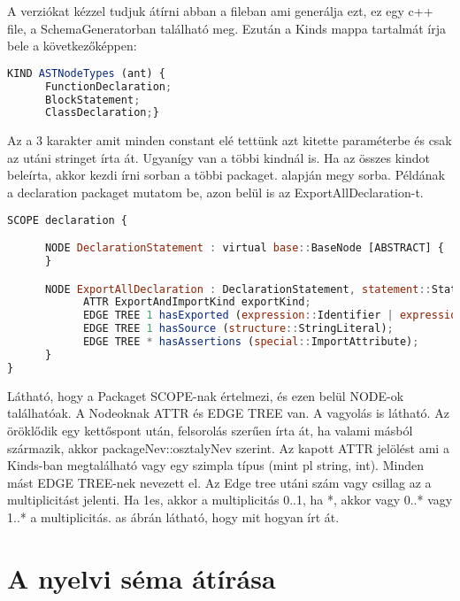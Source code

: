 A verziókat kézzel tudjuk átírni abban a fileban ami generálja ezt, ez egy c++ file, a SchemaGeneratorban található meg.
Ezután a Kinds mappa tartalmát írja bele a következőképpen:
\begin{lstlisting}[caption={Asg file kind},label={lst:asg_file_kinds}, language={JavaScript}]
KIND ASTNodeTypes (ant) {
      FunctionDeclaration;
      BlockStatement;
      ClassDeclaration;}
\end{lstlisting}
Az a 3 karakter amit minden constant elé tettünk azt kitette paraméterbe és csak az utáni stringet írta át. Ugyanígy van a többi kindnál is.
Ha az összes kindot beleírta, akkor kezdi írni sorban a többi packaget.  alapján megy sorba.
Példának a declaration packaget mutatom be, azon belül is az ExportAllDeclaration-t.
\begin{lstlisting}[caption={Asg file ExportAllDeclaration},label={lst:asg_file_export_all_declaration}, language={JavaScript}]
SCOPE declaration {

      NODE DeclarationStatement : virtual base::BaseNode [ABSTRACT] {
      }

      NODE ExportAllDeclaration : DeclarationStatement, statement::Statement, virtual statement::ProgramStatement, special::Node {
            ATTR ExportAndImportKind exportKind;
            EDGE TREE 1 hasExported (expression::Identifier | expression::LiteralExpression);
            EDGE TREE 1 hasSource (structure::StringLiteral);
            EDGE TREE * hasAssertions (special::ImportAttribute);
      }
}
\end{lstlisting}
Látható, hogy a Packaget SCOPE-nak értelmezi, és ezen belül NODE-ok találhatóak.
A Nodeoknak ATTR és EDGE TREE van. A vagyolás is látható.
Az öröklődik egy kettőspont után, felsorolás szerűen írta át, ha valami másból származik, akkor packageNev::osztalyNev szerint.
Az kapott ATTR jelölést ami a Kinds-ban megtalálható vagy egy szimpla típus (mint pl string, int).
Minden mást EDGE TREE-nek nevezett el. Az Edge tree utáni szám vagy csillag az a multiplicitást jelenti.
Ha 1es, akkor a multiplicitás 0..1, ha *, akkor vagy 0..* vagy 1..* a multiplicitás.
as ábrán látható, hogy mit hogyan írt át.

\section{A nyelvi séma átírása}

\noindent

